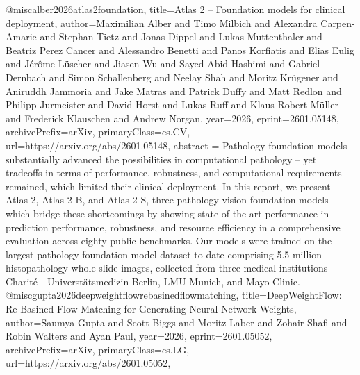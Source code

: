{}@misc{alber2026atlas2foundation,
      title={Atlas 2 -- Foundation models for clinical deployment}, 
      author={Maximilian Alber and Timo Milbich and Alexandra Carpen-Amarie and Stephan Tietz and Jonas Dippel and Lukas Muttenthaler and Beatriz Perez Cancer and Alessandro Benetti and Panos Korfiatis and Elias Eulig and Jérôme Lüscher and Jiasen Wu and Sayed Abid Hashimi and Gabriel Dernbach and Simon Schallenberg and Neelay Shah and Moritz Krügener and Aniruddh Jammoria and Jake Matras and Patrick Duffy and Matt Redlon and Philipp Jurmeister and David Horst and Lukas Ruff and Klaus-Robert Müller and Frederick Klauschen and Andrew Norgan},
      year={2026},
      eprint={2601.05148},
      archivePrefix={arXiv},
      primaryClass={cs.CV},
      url={https://arxiv.org/abs/2601.05148},
      abstract = {Pathology foundation models substantially advanced the possibilities in computational pathology -- yet tradeoffs in terms of performance, robustness, and computational requirements remained, which limited their clinical deployment. In this report, we present Atlas 2, Atlas 2-B, and Atlas 2-S, three pathology vision foundation models which bridge these shortcomings by showing state-of-the-art performance in prediction performance, robustness, and resource efficiency in a comprehensive evaluation across eighty public benchmarks. Our models were trained on the largest pathology foundation model dataset to date comprising 5.5 million histopathology whole slide images, collected from three medical institutions Charité - Universtätsmedizin Berlin, LMU Munich, and Mayo Clinic.}
}@misc{gupta2026deepweightflowrebasinedflowmatching,
      title={DeepWeightFlow: Re-Basined Flow Matching for Generating Neural Network Weights}, 
      author={Saumya Gupta and Scott Biggs and Moritz Laber and Zohair Shafi and Robin Walters and Ayan Paul},
      year={2026},
      eprint={2601.05052},
      archivePrefix={arXiv},
      primaryClass={cs.LG},
      url={https://arxiv.org/abs/2601.05052},
}
